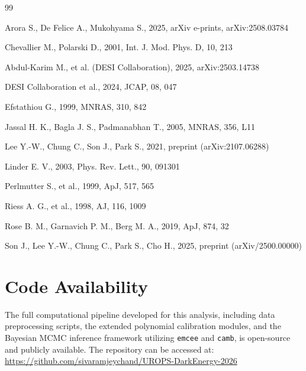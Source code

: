 \documentclass[12pt, a4paper]{article}
\begin{document}
\begin{thebibliography}{99}

Arora S., De Felice A., Mukohyama S., 2025, arXiv e-prints, arXiv:2508.03784

Chevallier M., Polarski D., 2001, Int. J. Mod. Phys. D, 10, 213

Abdul-Karim M., et al. (DESI Collaboration), 2025, arXiv:2503.14738

DESI Collaboration et al., 2024, JCAP, 08, 047

Efstathiou G., 1999, MNRAS, 310, 842

Jassal H. K., Bagla J. S., Padmanabhan T., 2005, MNRAS, 356, L11

Lee Y.-W., Chung C., Son J., Park S., 2021, preprint (arXiv:2107.06288)

Linder E. V., 2003, Phys. Rev. Lett., 90, 091301

Perlmutter S., et al., 1999, ApJ, 517, 565

Riess A. G., et al., 1998, AJ, 116, 1009

Rose B. M., Garnavich P. M., Berg M. A., 2019, ApJ, 874, 32

Son J., Lee Y.-W., Chung C., Park S., Cho H., 2025, preprint (arXiv/2500.00000)

\end{thebibliography}

\appendix

\section{Code Availability}
The full computational pipeline developed for this analysis, including data preprocessing scripts, the extended polynomial calibration modules, and the Bayesian MCMC inference framework utilizing \texttt{emcee} and \texttt{camb}, is open-source and publicly available. The repository can be accessed at: 
\url{https://github.com/sivaramjeychand/UROPS-DarkEnergy-2026}
\end{document}
